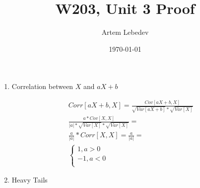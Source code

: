 \documentclass{article}
\author{Artem Lebedev}
\title{W203, Unit 3 Proof}
\date{\today}
\begin{document}
\maketitle

\begin{enumerate}
\item Correlation between $X$ and $aX+b$

\begin{align*}
Corr[aX+b,X] = \frac{Cov[aX+b,X]}{\sqrt{Var[aX+b]}*\sqrt{Var[X]}}\\[1em] \frac{a*Cov[X,X]}{{|a|}*\sqrt{Var[X]}*\sqrt{Var[X]}} = \\[1em]
\frac{a}{|a|}*Corr[X,X] = \frac{a}{|a|} =\\[1em]
\begin{cases}
1, a>0\\
-1, a<0\\
\end{cases}  
\end{align*}

\item Heavy Tails
\end{enumerate}
\end{document}
